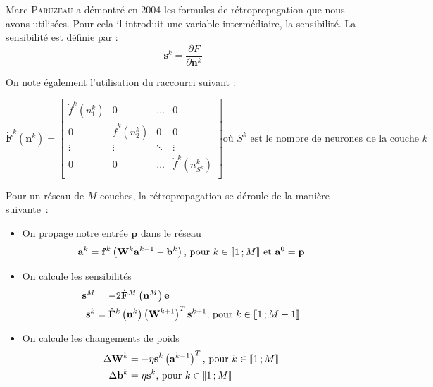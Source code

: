 Marc \textsc{Paruzeau} a démontré en 2004 les formules de rétropropagation que nous avons utilisées. Pour cela il introduit une variable intermédiaire, la sensibilité. La sensibilité est définie par :
\begin{equation}
 \mathbf{s}^k = \frac{\partial F}{\partial \mathbf{n}^k}
\end{equation}

On note également l'utilisation du raccourci suivant : 

\begin{equation}
  \displaystyle
 \mathbf{\dot F}^k\left(\mathbf{n}^k\right) =
 \begin{bmatrix}
  \dot f ^k\left(n^k_1\right) & 0 & \ldots & 0\\
  0 & \dot f^k\left(n^k_2\right) & 0 & 0\\
  \vdots & \vdots & \ddots & \vdots \\
  0 & 0 & \ldots & \dot f^k\left(n^k_{S^k}\right)\\
 \end{bmatrix}
 \text{où $S^k$ est le nombre de neurones de la couche $k$}
\end{equation}

Pour un réseau de $M$ couches, la rétropropagation se déroule de la manière suivante~:
\begin{itemize}
 \item On propage notre entrée $\mathbf{p}$ dans le réseau
 \begin{equation}
   \mathbf{a}^k = \mathbf{f}^k\left(\mathbf{W}^k\mathbf{a}^{k-1} - \mathbf{b}^k\right) \text{, pour $k \in \mathopen{\llbracket}1\,;M\mathclose{\rrbracket}$ et $\mathbf{a}^0 = \mathbf{p}$}
 \end{equation}
 
 \item On calcule les sensibilités 
 \begin{align}
  \mathbf{s}^M &= -2\mathbf{\dot F}^M\left(\mathbf{n}^M\right)\mathbf{e} \\
  \mathbf{s}^k &= \mathbf{\dot F}^k\left(\mathbf{n}^k\right)\left(\mathbf{W}^{k+1}\right)^T \mathbf{s}^{k+1} \text{, pour $k \in \mathopen{\llbracket}1\,;M-1\mathclose{\rrbracket}$}
 \end{align}
 
 \item On calcule les changements de poids
 \begin{align}
  \Delta \mathbf{W}^k &= - \eta \mathbf{s}^k\left(\mathbf{a}^{k-1}\right)^T \text{, pour $k \in \mathopen{\llbracket}1\,;M\mathclose{\rrbracket}$} \\
  \Delta \mathbf{b}^k &= \eta \mathbf{s}^k \text{, pour $k \in \mathopen{\llbracket}1\,;M\mathclose{\rrbracket}$}
 \end{align}

\end{itemize}

